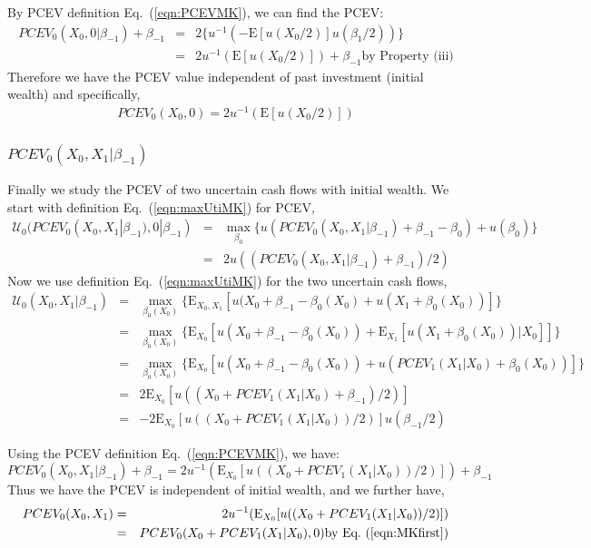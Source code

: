 \documentclass{article}[12pt letter]
\newcommand{\E}{\mathrm{E}}
\begin{document}
By PCEV definition Eq.~(\ref{eqn:PCEVMK}), we can find the PCEV:
\begin{eqnarray*}
PCEV_0(X_0,0|\beta_{-1}) + \beta_{-1} &=& 2\{u^{-1}(-\E[u(X_0/2)]u(\beta_1/2))\}\\
&=& 2u^{-1}(\E[u(X_0/2)]) + \beta_{-1} \text{by Property (iii)}
\end{eqnarray*}
Therefore we have the PCEV value independent of past investment (initial wealth) and specifically,
\begin{align}\label{eqn:MKfirst}
PCEV_0(X_0,0) = 2u^{-1}(\E[u(X_0/2)])
\end{align}

\subsubsection{$PCEV_0(X_0,X_1|\beta_{-1})$}
Finally we study the PCEV of two uncertain cash flows with initial wealth. We start with definition Eq.~(\ref{eqn:maxUtiMK}) for PCEV,
\begin{eqnarray*}
\mathcal{U}_0(PCEV_0(X_0,X_1|\beta_{-1}),0|\beta_{-1}) &=& \max_{\beta_0}\{u(PCEV_0(X_0,X_1|\beta_{-1})+\beta_{-1}-\beta_0)+u(\beta_0)\}\\
&=& 2u((PCEV_0(X_0,X_1|\beta_{-1})+ \beta_{-1})/2)
\end{eqnarray*}
Now we use definition Eq.~(\ref{eqn:maxUtiMK}) for the two uncertain cash flows,
 \begin{eqnarray*}
\mathcal{U}_0(X_0,X_1|\beta_{-1}) &=& \max_{\beta_0(X_0)} \{\E_{X_0,X_1}[u(X_0 + \beta_{-1}-\beta_0(X_0) + u(X_1 + \beta_0(X_0)) ]\} \\
&=& \max_{\beta_0(X_0)} \{\E_{X_0} [u(X_0+ \beta_{-1} - \beta_0(X_0)) + \E_{X_1}[u(X_1+\beta_0(X_0))|X_0]]\}\\
& = & \max_{\beta_0(X_0)} \{\E_{X_0} [u(X_0+ \beta_{-1} - \beta_0(X_0)) + u(PCEV_1(X_1|X_0) + \beta_0(X_0))]\}\\
&=& 2\E_{X_0}[u((X_0+PCEV_1(X_1|X_0) +\beta_{-1})/2)]\\
&=& -2\E_{X_0}[u((X_0+PCEV_1(X_1|X_0)) /2)]u(\beta_{-1}/2)
\end{eqnarray*}

Using the PCEV definition Eq.~(\ref{eqn:PCEVMK}), we have:
\[PCEV_0(X_0,X_1|\beta_{-1}) + \beta_{-1} = 2u^{-1}(\E_{X_0}[u((X_0+PCEV_1(X_1|X_0)) /2)]) + \beta_{-1} \]
Thus we have the PCEV is independent of initial wealth, and we further have,
\begin{align}
PCEV_0(X_0,X_1) &=& 2u^{-1}(\E_{X_0}[u((X_0+PCEV_1(X_1|X_0)) /2)])\nonumber \\
&=& PCEV_0(X_0 + PCEV_1(X_1|X_0),0)  \text{by Eq.~(\ref{eqn:MKfirst})}
\end{align}
\end{document}
